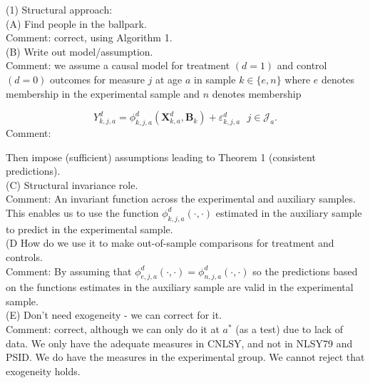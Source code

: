



\doublespacing


\noindent (1) Structural approach:\\

\noindent (A) Find people in the ballpark.\\
\noindent Comment: correct, using Algorithm 1.\\

\noindent (B) Write out model/assumption.\\
\noindent  Comment: we assume a causal model for treatment $(d = 1)$ and control $(d = 0)$ outcomes for measure $j$ at age $a$ in sample $k \in \{ e, n \}$ where $e$ denotes membership in the experimental sample and $n$ denotes membership 

\begin{equation}
Y_{k,j,a}^d = \phi_{k,j,a}^d \left( \bm{X}_{k,a}^d, \bm{B}_{k} \right) + \varepsilon_{k,j,a}^d \ \ \ j \in \mathcal{J}_{a}.
\end{equation}Comment: 

\noindent Then impose (sufficient) assumptions leading to Theorem 1 (consistent predictions).\\

\noindent (C) Structural invariance role.\\
\noindent Comment: An invariant function across the experimental and auxiliary samples. This enables us to use the function $\phi_{k,j,a}^d \left( \cdot, \cdot \right)$ estimated in the auxiliary sample to predict in the experimental sample.\\

\noindent (D How do we use it to make out-of-sample comparisons for treatment and controls.\\
\noindent Comment: By assuming that $\phi_{e,j,a}^d \left( \cdot, \cdot \right) = \phi_{n,j,a}^d \left( \cdot, \cdot \right)$ so the predictions based on the functions estimates in the auxiliary sample are valid in the experimental sample.\\

\noindent (E) Don't need exogeneity - we can correct for it.\\ 
\noindent Comment: correct, although we can only do it at $a^*$ (as a test) due to lack of data. We only have the adequate measures in CNLSY, and not in NLSY79 and PSID. We do have the measures in the experimental group. We cannot reject that exogeneity holds.\\

